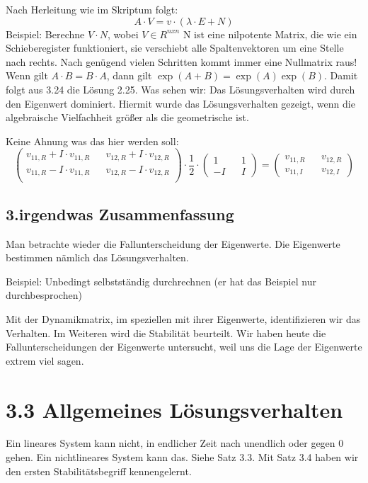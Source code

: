\documentclass[a4paper]{article}
\begin{document}
Nach Herleitung wie im Skriptum folgt:
\[A\cdot V=v\cdot (\lambda\cdot E+N)\]
 Beispiel:  Berechne $V\cdot N$, wobei $V \in R^{n x n}$
N ist eine nilpotente Matrix, die wie ein Schieberegister funktioniert, sie verschiebt alle Spaltenvektoren um eine Stelle nach rechts. Nach genügend vielen Schritten kommt immer eine Nullmatrix raus!
\newline
Wenn gilt $A\cdot B=B\cdot A$, dann gilt $\exp(A+B)=\exp(A)\exp(B)$. Damit folgt aus 3.24 die Lösung 2.25.
Was sehen wir: Das Lösungsverhalten wird durch den Eigenwert dominiert. Hiermit wurde das Lösungsverhalten gezeigt, wenn die algebraische Vielfachheit größer als die geometrische ist.

Keine Ahnung was das hier werden soll:
 \[
\begin{pmatrix}
    v_{11,R}+I\cdot v_{11,R} && v_{12,R}+I\cdot v_{12,R}\\
v_{11,R}-I\cdot v_{11,R} && v_{12,R}-I\cdot v_{12,R}\\
\end{pmatrix}  
\cdot \frac{1}{2}\cdot
\begin{pmatrix}
1 && 1\\
-I && I
\end{pmatrix} =
\begin{pmatrix}
v_{11,R} && v_{12,R}\\
v_{11,I} && v_{12,I}
\end{pmatrix} 
\]

 \subsection*{3.irgendwas Zusammenfassung}
 Man betrachte wieder die Fallunterscheidung der Eigenwerte. Die Eigenwerte bestimmen nämlich das Lösungsverhalten.\newline

Beispiel: Unbedingt selbstständig durchrechnen (er hat das Beispiel nur durchbesprochen)

Mit der Dynamikmatrix, im speziellen mit ihrer Eigenwerte, identifizieren wir das Verhalten. Im Weiteren wird die Stabilität beurteilt. Wir haben heute die Fallunterscheidungen der Eigenwerte untersucht, weil uns die Lage der Eigenwerte extrem viel sagen.
\section*{3.3 Allgemeines Lösungsverhalten}
Ein lineares System kann nicht, in endlicher Zeit nach unendlich oder gegen 0 gehen. Ein nichtlineares System kann das. Siehe Satz 3.3. Mit Satz 3.4 haben wir den ersten Stabilitätsbegriff kennengelernt.
\end{document}
